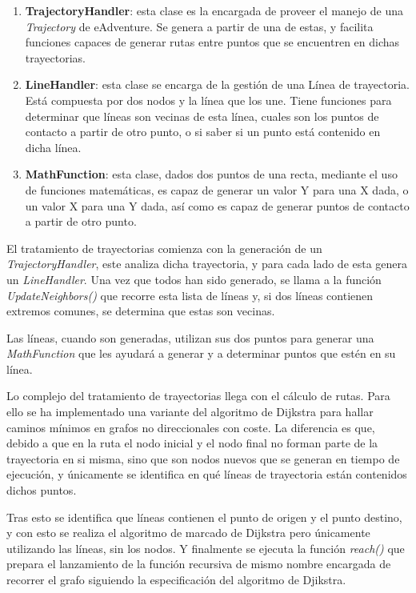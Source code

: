 \begin{enumerate}
	\item \textbf{TrajectoryHandler}: esta clase es la encargada de proveer el manejo de una \textit{Trajectory} de eAdventure. Se genera a partir de una de estas, y facilita funciones capaces de generar rutas entre puntos que se encuentren en dichas trayectorias.
	
	\item \textbf{LineHandler}: esta clase se encarga de la gestión de una Línea de trayectoria. Está compuesta por dos nodos y la línea que los une. Tiene funciones para determinar que líneas son vecinas de esta línea, cuales son los puntos de contacto a partir de otro punto, o si saber si un punto está contenido en dicha línea.
	
	\item \textbf{MathFunction}: esta clase, dados dos puntos de una recta, mediante el uso de funciones matemáticas, es capaz de generar un valor Y para una X dada, o un valor X para una Y dada, así como es capaz de generar puntos de contacto a partir de otro punto.
\end{enumerate}

El tratamiento de trayectorias comienza con la generación de un \textit{TrajectoryHandler}, este analiza dicha trayectoria, y para cada lado de esta genera un \textit{LineHandler}. Una vez que todos han sido generado, se llama a la función \textit{UpdateNeighbors()} que recorre esta lista de líneas y, si dos líneas contienen extremos comunes, se determina que estas son vecinas.

Las líneas, cuando son generadas, utilizan sus dos puntos para generar una \textit{MathFunction} que les ayudará a generar y a determinar puntos que estén en su línea.

Lo complejo del tratamiento de trayectorias llega con el cálculo de rutas. Para ello se ha implementado una variante del algoritmo de Dijkstra para hallar caminos mínimos en grafos no direccionales con coste. La diferencia es que, debido a que en la ruta el nodo inicial y el nodo final no forman parte de la trayectoria en si misma, sino que son nodos nuevos que se generan en tiempo de ejecución, y únicamente se identifica en qué líneas de trayectoria están contenidos dichos puntos.

Tras esto se identifica que líneas contienen el punto de origen y el punto destino, y con esto se realiza el algoritmo de marcado de Dijkstra pero únicamente utilizando las líneas, sin los nodos. Y finalmente se ejecuta la función \textit{reach()} que prepara el lanzamiento de la función recursiva de mismo nombre encargada de recorrer el grafo siguiendo la especificación del algoritmo de Djikstra.

